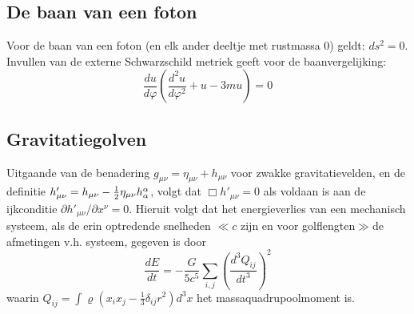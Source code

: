 \subsection{De baan van een foton}
Voor de baan van een foton (en elk ander deeltje met rustmassa 0) geldt:
$ds^2=0$. Invullen van de externe Schwarzschild metriek geeft voor de
baanvergelijking:
\[
\frac{du}{d\varphi}\left(\frac{d^2u}{d\varphi^2}+u-3mu\right)=0
\]

\subsection{Gravitatiegolven}
Uitgaande van de benadering $g_{\mu\nu}=\eta_{\mu\nu}+h_{\mu\nu}$ voor zwakke
gravitatievelden, en de definitie $h'_{\mu\nu}=h_{\mu\nu}-\mbox{$\frac{1}{2}$}\eta_{\mu\nu}h^{\alpha}_{\alpha}$,
volgt dat $\Box h'_{\mu\nu}=0$ als voldaan is aan de ijkconditie
$\partial h'_{\mu\nu}/\partial x^\nu=0$. Hieruit volgt dat het energieverlies
van een mechanisch systeem, als de erin optredende snelheden $\ll c$ zijn en
voor golflengten$\gg$de afmetingen v.h. systeem, gegeven is door
\[
\frac{dE}{dt}=-\frac{G}{5c^5}\sum_{i,j}\left(\frac{d^3Q_{ij}}{dt^3}\right)^2
\]
waarin $Q_{ij}=\int\varrho(x_ix_j-\frac{1}{3}\delta_{ij}r^2)d^3x$ het
massaquadrupoolmoment is.

